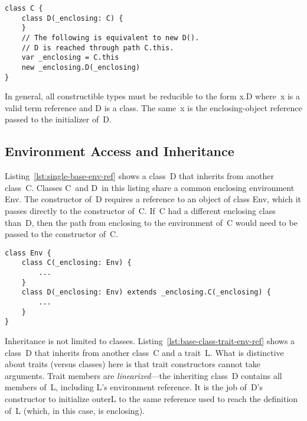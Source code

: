 \begin{lstlisting}[float=htbp, caption={Path Dependence and Enclosing References}, label={lst:new-path-dep}]
class C {
	class D(_enclosing: C) {
	}
	// The following is equivalent to new D().
	// D is reached through path C.this.
	var _enclosing = C.this
	new _enclosing.D(_enclosing)
}
\end{lstlisting}

In general, all constructible types must be reducible to the form \mbox{\cd x.D} where~{\cd x} is a valid term reference and {\cd D} is a class. The same~{\cd x} is the enclosing-object reference passed to the initializer of~{\cd D}.





\subsection{Environment Access and Inheritance}

Listing~\ref{lst:single-base-env-ref} shows a class~{\cd D} that inherits from another class~{\cd C}. Classes {\cd C}~and {\cd D}~in this listing share a common enclosing environment {\cd Env}. The constructor of~{\cd D} requires a reference to an object of class {\cd Env}, which it passes directly to the constructor of~{\cd C}. If~{\cd C} had a different enclosing class than~{\cd D}, then the path from {\cd \und enclosing} to the environment of~{\cd C} would need to be passed to the constructor of~{\cd C}. 



\begin{lstlisting}[float=htbp, caption={Single Base Class with Environment Reference}, label={lst:single-base-env-ref}]
class Env {
	class C(_enclosing: Env) {
		...
	}
	class D(_enclosing: Env) extends _enclosing.C(_enclosing) {
		...
	}
}
\end{lstlisting}

Inheritance is not limited to classes.
Listing~\ref{lst:base-class-trait-env-ref} shows a class~{\cd D} that inherits from another class~{\cd C} and a trait~{\cd L}. What is distinctive about traits (versus classes) here is that trait constructors cannot take arguments. Trait members are {\em linearized}---the inheriting class~{\cd D} contains all members of~{\cd L}, including \mbox{{\cd L}'s} environment reference. It is the job of~\mbox{{\cd D}'s} constructor to initialize {\cd \und outer\und L} to the same reference used to reach the definition of~{\cd L} (which, in this case, is {\cd \und enclosing}).

